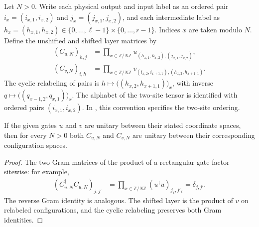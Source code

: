 \begin{definition}
    \label{def:mpu_two_site_circuit_layers}
    \leanok
    Let $N>0$. Write each physical output and input label as an ordered pair
    $i_x=(i_{x,1},i_{x,2})$ and $j_x=(j_{x,1},j_{x,2})$, and each intermediate
    label as $h_x=(h_{x,1},h_{x,2})\in\{0,\ldots,\ell-1\}\times
        \{0,\ldots,r-1\}$. Indices $x$ are taken modulo $N$. Define the
    unshifted and shifted layer matrices by
    \begin{align}
        (C_{u,N})_{h,j}
         & =\prod_{x\in\mathbb Z/N\mathbb Z}
        u_{(h_{x,1},h_{x,2}),(j_{x,1},j_{x,2})}, \\
        (C_{v,N})_{i,h}
         & =\prod_{x\in\mathbb Z/N\mathbb Z}
        v_{(i_{x,2},i_{x+1,1}),(h_{x,2},h_{x+1,1})}.
    \end{align}
    The cyclic relabeling of pairs is
    $h\mapsto\bigl((h_{x,2},h_{x+1,1})\bigr)_x$, with inverse
    $q\mapsto\bigl((q_{x-1,2},q_{x,1})\bigr)_x$. The alphabet of the
    two-site tensor is identified with ordered pairs $(i_{x,1},i_{x,2})$.
    In \cite[Equation~\texttt{StandardForm}]{Cirac2017MPU}, this convention specifies the two-site
    ordering.
\end{definition}

\begin{lemma}
    \label{thm:mpu_two_site_circuit_layers_unitary}
    \leanok
    If the given gates $u$ and $v$ are unitary between their stated
    coordinate spaces, then for every $N>0$ both $C_{u,N}$ and $C_{v,N}$
    are unitary between their corresponding configuration spaces.
\end{lemma}

\begin{proof}\leanok
    The two Gram matrices of the product of a rectangular gate factor
    sitewise: for example,
    \begin{align}
        (C_{u,N}^{\dagger}C_{u,N})_{j,j'}
         & =\prod_{x\in\mathbb Z/N\mathbb Z}
        (u^{\dagger}u)_{j_x,j'_x}=\delta_{j,j'}.
    \end{align}
    The reverse Gram identity is analogous. The shifted layer is the
    product of $v$ on relabeled configurations, and the cyclic relabeling
    preserves both Gram identities.
\end{proof}


